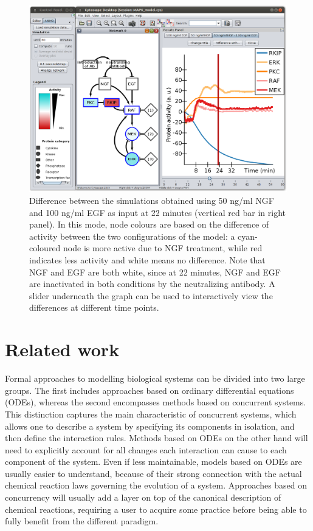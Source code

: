 \documentclass[journal, 10pt]{IEEEtran}
\begin{document}
\begin{figure}[htb]
\centering
  \includegraphics[width=.48\textwidth]{mapk_model_diff4}
\caption{Difference between the simulations obtained using
50 ng/ml NGF and 100 ng/ml EGF as input at 22 minutes (vertical red bar in right panel). In this mode, node colours
are based on the difference of activity between the two configurations of the model:
a cyan-coloured node is more active due to NGF treatment, while red indicates less activity and white
means no difference. Note that NGF and EGF are both white, since at 22 minutes, 
NGF and EGF are inactivated in both conditions by the neutralizing antibody. A slider underneath the graph can be used to 
interactively view the differences at different time points. \label{fig:case-study-diff}}
\end{figure}




\section{Related work}\label{sec:related-work}
Formal approaches to modelling biological systems can be divided into two large groups. The first 
includes approaches based on ordinary differential equations (ODEs), whereas the second 
encompasses methods based on concurrent systems. This distinction captures the main
characteristic of concurrent systems, which allows one to describe a system by specifying its
components in isolation, and then define the interaction rules. Methods based on ODEs on the other 
hand will need to explicitly account for all changes each interaction can cause to each component of the system.
Even if less maintainable, models based on ODEs are usually easier to understand, because of their strong
connection with the actual chemical reaction laws governing the evolution of a system. Approaches based 
on concurrency will usually add a layer on top of the canonical description of chemical reactions, 
requiring a user to acquire some practice before being able to fully benefit from the different paradigm.
\end{document}
